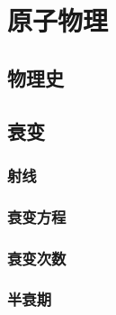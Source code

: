 \documentclass[cn,blue,11pt,normal]{elegantnote}
\begin{document}
\newpage
\section{原子物理}

\subsection{物理史}
\begin{proset}
	
\end{proset}
\subsection{衰变}
\subsubsection{射线}
\begin{proset}
	
\end{proset}
\begin{proset}
	
\end{proset}
\subsubsection{衰变方程}
\begin{proset}
	
\end{proset}
\begin{proset}
	
\end{proset}
\begin{proset}
	
\end{proset}

\subsubsection{衰变次数}
\begin{proset}
	
\end{proset}
\begin{proset}
	
\end{proset}
\begin{proset}
	
\end{proset}

\subsubsection{半衰期}
\begin{proset}
	
\end{proset}
\begin{proset}
	
\end{proset}
\begin{proset}
	
\end{proset}
\end{document}

